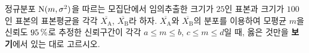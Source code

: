 정규분포 $\mathrm{N}(m{,}\mkern3mu\mathopen{}\sigma^2)$을 따르는 모집단에서 임의추출한 크기가 $25$인 표본과 크기가 $100$인 표본의 표본평균을 각각 $\overline{X_{\mathrm{A}}}$, $\overline{X_{\mathrm{B}}}$라 하자. $\overline{X_{\mathrm{A}}}$와 $\overline{X_{\mathrm{B}}}$의 분포를 이용하여 모평균 $m$을 신뢰도 $95\mkern3mu \%$로 추정한 신뢰구간이 각각 $a\le m\le b$, $c\le m\le d$일 때, 옳은 것만을 \textbf{보기}에서 있는 대로 고르시오. 
